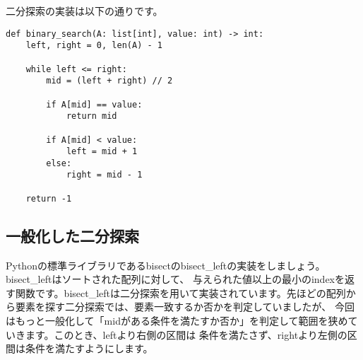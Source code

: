 \documentclass{jlreq}
\begin{document}
\begin{center}
\end{center}

二分探索の実装は以下の通りです。

\begin{lstlisting}[caption=二分探索の実装, frame=TRBL, label={simle_binary}]
def binary_search(A: list[int], value: int) -> int:
    left, right = 0, len(A) - 1
    
    while left <= right:
        mid = (left + right) // 2
        
        if A[mid] == value:
            return mid
        
        if A[mid] < value:
            left = mid + 1
        else:
            right = mid - 1
    
    return -1
\end{lstlisting}

\subsection{一般化した二分探索}
Pythonの標準ライブラリであるbisectのbisect\_leftの実装をしましょう。bisect\_leftはソートされた配列に対して、
与えられた値以上の最小のindexを返す関数です。bisect\_leftは二分探索を用いて実装されています。先ほどの配列から要素を探す二分探索では、要素一致するか否かを判定していましたが、
今回はもっと一般化して「midがある条件を満たすか否か」を判定して範囲を狭めていきます。このとき、leftより右側の区間は
条件を満たさず、rightより左側の区間は条件を満たすようにします。 
\end{document}
